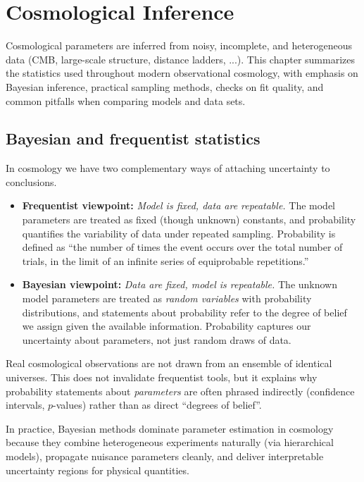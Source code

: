 \chapter{Cosmological Inference}
\label{ch:cosmological_inference}

Cosmological parameters are inferred from noisy, incomplete, and heterogeneous data (CMB, large-scale structure, distance ladders, ...). This chapter summarizes the statistics used throughout modern observational cosmology, with emphasis on Bayesian inference, practical sampling methods, checks on fit quality, and common pitfalls when comparing models and data sets.

\section{Bayesian and frequentist statistics}

In cosmology we have two complementary ways of attaching uncertainty to conclusions.

\begin{itemize}
    \item \textbf{Frequentist viewpoint:} \textit{Model is fixed, data are repeatable.} The model parameters are treated as fixed (though unknown) constants, and probability quantifies the variability of data under repeated sampling. Probability is defined as ``the number of times the event occurs over the total number of trials, in the limit of an infinite series of equiprobable repetitions.''

    \item \textbf{Bayesian viewpoint:} \textit{Data are fixed, model is repeatable.} The unknown model parameters are treated as \textit{random variables} with probability distributions, and statements about probability refer to the degree of belief we assign given the available information. Probability captures our uncertainty about parameters, not just random draws of data.
\end{itemize}

\begin{observationblock}[Repeatability]
        Real cosmological observations are not drawn from an ensemble of identical universes. This does not invalidate frequentist tools, but it explains why probability statements about \emph{parameters} are often phrased indirectly (confidence intervals, $p$-values) rather than as direct ``degrees of belief''.
\end{observationblock}

In practice, Bayesian methods dominate parameter estimation in cosmology because they combine heterogeneous experiments naturally (via hierarchical models), propagate nuisance parameters cleanly, and deliver interpretable uncertainty regions for physical quantities.

